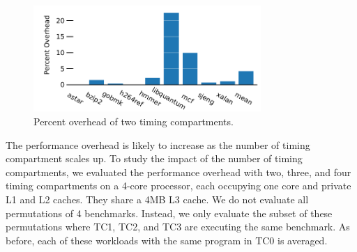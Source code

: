 \begin{figure}
   \begin{center}
       \includegraphics[width=3.4in]{figs/two_tcs.pdf}
       \caption{Percent overhead of two timing compartments.}
       \label{fig:two_tc_overhead}
   \end{center}
\end{figure}



The performance overhead is likely to increase as the number of timing 
compartment scales up. To study the impact of the number of timing 
compartments, we evaluated the performance overhead with two, three, and four 
timing compartments on a 4-core  processor, each occupying one core and private 
L1 and L2 caches. They share a 4MB L3 cache. We do not evaluate all 
permutations of 4 benchmarks. Instead, we only evaluate the subset of these 
permutations where TC1, TC2, and TC3 are executing the same benchmark. As 
before, each of these workloads with the same program in TC0 is averaged.

